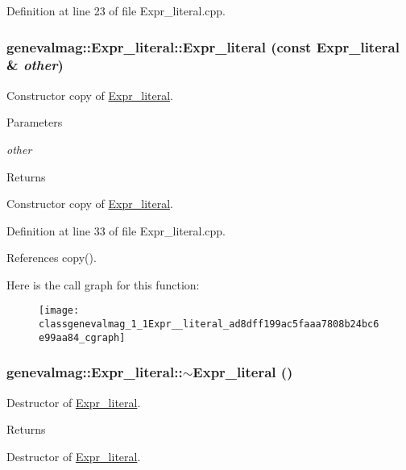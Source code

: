 Definition at line 23 of file Expr\_\-literal.cpp.

\hypertarget{classgenevalmag_1_1Expr__literal_ad8dff199ac5faaa7808b24bc6e99aa84}{
\subsubsection[{Expr\_\-literal}]{\setlength{\rightskip}{0pt plus 5cm}genevalmag::Expr\_\-literal::Expr\_\-literal (const {\bf Expr\_\-literal} \& {\em other})}}
\label{classgenevalmag_1_1Expr__literal_ad8dff199ac5faaa7808b24bc6e99aa84}
Constructor copy of \hyperlink{classgenevalmag_1_1Expr__literal}{Expr\_\-literal}. 
\begin{DoxyParams}{Parameters}
\item[{\em other}]\end{DoxyParams}
\begin{DoxyReturn}{Returns}

\end{DoxyReturn}
Constructor copy of \hyperlink{classgenevalmag_1_1Expr__literal}{Expr\_\-literal}. 

Definition at line 33 of file Expr\_\-literal.cpp.



References copy().



Here is the call graph for this function:\nopagebreak
\begin{figure}[H]
\begin{center}
\leavevmode
\texttt{[image: classgenevalmag\_1\_1Expr\_\_literal\_ad8dff199ac5faaa7808b24bc6e99aa84\_cgraph]}
\end{center}
\end{figure}


\hypertarget{classgenevalmag_1_1Expr__literal_afaa929f1cd65a7486a29e4d110c73f89}{
\subsubsection[{$\sim$Expr\_\-literal}]{\setlength{\rightskip}{0pt plus 5cm}genevalmag::Expr\_\-literal::$\sim$Expr\_\-literal ()}}
\label{classgenevalmag_1_1Expr__literal_afaa929f1cd65a7486a29e4d110c73f89}
Destructor of \hyperlink{classgenevalmag_1_1Expr__literal}{Expr\_\-literal}. \begin{DoxyReturn}{Returns}

\end{DoxyReturn}
Destructor of \hyperlink{classgenevalmag_1_1Expr__literal}{Expr\_\-literal}. 

